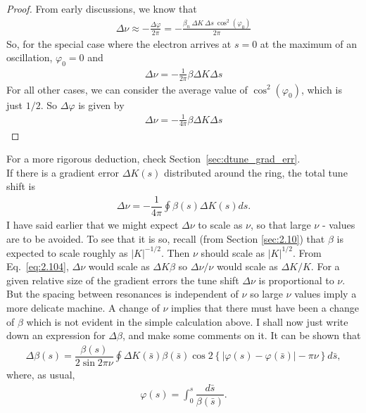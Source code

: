 \begin{proof}
	From early discussions, we know that
	\begin{align*}
		\Delta \nu \approx - \frac{\Delta \varphi}{2\pi} = -\frac{\beta_n\ \Delta K\ \Delta s\ \cos^2(\varphi_0)}{2\pi}
	\end{align*}
    So, for the special case where the electron arrives at $s=0$ at the maximum of an oscillation, $\varphi_0=0$ and
    \begin{align*}
		\Delta \nu = -\frac{1}{2\pi}\beta \Delta K \Delta s
	\end{align*}
    For all other cases, we can consider the average value of $\cos^2(\varphi_0)$, which is just $1/2$. So $\Delta \varphi$ is given by
	\begin{align*}
		\Delta \nu = -\frac{1}{4\pi}\beta \Delta K \Delta s
	\end{align*}
\end{proof}
For a more rigorous deduction, check Section~\ref{sec:dtune_grad_err}.\\
If there is a gradient error $\Delta K(s)$ distributed around the ring, the total tune shift is
\begin{align}\label{eq:2.104}
	\Delta\nu = -\dfrac{1}{4\pi}\oint \beta(s) \Delta K(s) ds.
\end{align}
I have said earlier that we might expect $\Delta\nu$ to scale as $\nu$, so that large $\nu$ -
values are to be avoided. To see that it is so, recall (from Section \ref{sec:2.10}) that $\beta$ is expected to scale roughly as $|K|^{-1/2}$. Then $\nu$ should scale as $|K|^{1/2}$. From Eq.~\eqref{eq:2.104}, $\Delta\nu$ would scale as $\Delta K\beta$ so $\Delta\nu/\nu$ would scale as $\Delta K/K$. For a given relative size of the gradient errors the tune shift $\Delta\nu$ is proportional to $\nu$. But the spacing between resonances is independent of $\nu$ so large $\nu$ values imply a more delicate machine.
A change of $\nu$ implies that there must have been a change of $\beta$ which is not evident in the simple calculation above. I shall now just write down an expression for $\Delta\beta$, and make some comments on it. It can be shown that
\begin{align}\label{eq:2.105}
	\boxed{\Delta\beta(s) = \dfrac{\beta(s)}{2\sin2\pi\nu}\oint \Delta K(\bar{s})\beta(\bar{s})\cos2\left\lbrace |\varphi(s) - \varphi(\bar{s})| - \pi\nu \right\rbrace d\bar{s}},
\end{align}
where, as usual,
\begin{align*}
	\varphi(s) = \int_0^s\dfrac{d\bar{s}}{\beta(\bar{s})}.
\end{align*}
